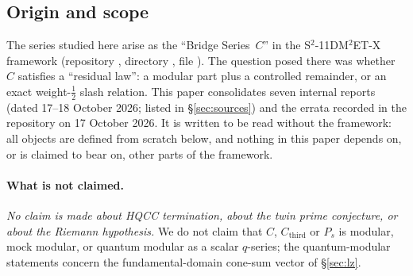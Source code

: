 \documentclass[11pt]{article}
\theoremstyle{definition}
\theoremstyle{plain}
\newcommand{\Cthird}{C_{\mathrm{third}}}
\begin{document}
\subsection{Origin and scope}
The series studied here arise as the ``Bridge Series~$C$'' in the S$^2$-11DM$^2$ET-X framework
(repository , directory
, file ).
The question posed there was whether $C$ satisfies a ``residual law'': a modular part plus a controlled
remainder, or an exact weight-$\tfrac12$ slash relation. This paper consolidates seven internal reports
(dated 17--18 October 2026; listed in \S\ref{sec:sources}) and the errata recorded in the repository on
17 October 2026. It is written to be read without the framework: all objects are defined from scratch
below, and nothing in this paper depends on, or is claimed to bear on, other parts of the framework.

\paragraph{What is not claimed.} \emph{No claim is made about HQCC termination, about the twin prime
conjecture, or about the Riemann hypothesis.} We do not claim that $C$, $\Cthird$ or $P_s$ is modular,
mock modular, or quantum modular as a scalar $q$-series; the quantum-modular statements concern the
fundamental-domain cone-sum vector of \S\ref{sec:lz}.
\end{document}
